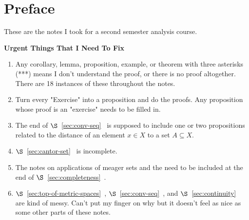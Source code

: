 \documentclass[10pt,twoside,openany]{memoir}
\begin{document}
    \tableofcontents

    \chapter*{Preface}
    These are the notes I took for a second semester analysis course. \nl
    
    \noindent \textbf{Urgent Things That I Need To Fix}
    \begin{enumerate}[label = (\arabic*),itemsep=1pt,topsep=3pt]
        \item Any corollary, lemma, proposition, example, or theorem with three asterisks (***) means I don't understand the proof, or there is no proof altogether. There are 18 instances of these throughout the notes.
        \item Turn every "Exercise" into a proposition and do the proofs. Any proposition whose proof is an "exercise" needs to be filled in.
        \item The end of $\S$~\ref{sec:conv-seq}~ is supposed to include one or two propositions related to the distance of an element $x \in X$ to a set $A \subseteq X$.
        \item $\S$~\ref{sec:cantor-set}~ is incomplete. 
        \item The notes on applications of meager sets and the  need to be included at the end of $\S$~\ref{sec:completeness}~.
        \item $\S$~\ref{sec:top-of-metric-spaces}~, $\S$~\ref{sec:conv-seq}~, and $\S$~\ref{sec:continuity}~ are kind of messy. Can't put my finger on why but it doesn't feel as nice as some other parts of these notes.
    \end{enumerate}
\end{document}

